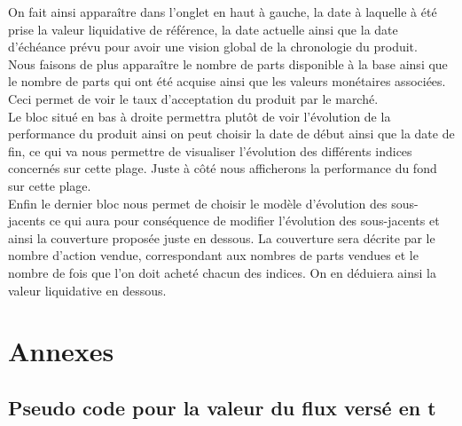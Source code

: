 \documentclass[french,12pt,a4paper]{article}
\begin{document}
On fait ainsi apparaître dans l'onglet en haut à gauche, la date à laquelle à été prise la valeur liquidative de référence, la date actuelle ainsi que la date d'échéance prévu pour avoir une vision global de la chronologie du produit.\\
Nous faisons de plus apparaître le nombre de parts disponible à la base ainsi que le nombre de parts qui ont été acquise ainsi que les valeurs monétaires associées. Ceci permet de voir le taux d'acceptation du produit par le marché.\\
Le bloc situé en bas à droite permettra plutôt de voir l'évolution de la performance du produit ainsi on peut choisir la date de début ainsi que la date de fin, ce qui va nous permettre de visualiser l'évolution des différents indices concernés sur cette plage. Juste à côté nous afficherons la performance du fond sur cette plage.\\
Enfin le dernier bloc nous permet de choisir le modèle d'évolution des sous-jacents ce qui aura pour conséquence de modifier l'évolution des sous-jacents et ainsi la couverture proposée juste en dessous.
La couverture sera décrite par le nombre d'action vendue, correspondant aux nombres de parts vendues et le nombre de fois que l'on doit acheté chacun des indices. On en déduiera ainsi la valeur liquidative en dessous.

\section{Annexes}

\subsection{Pseudo code pour la valeur du flux versé en t}
\end{document}
